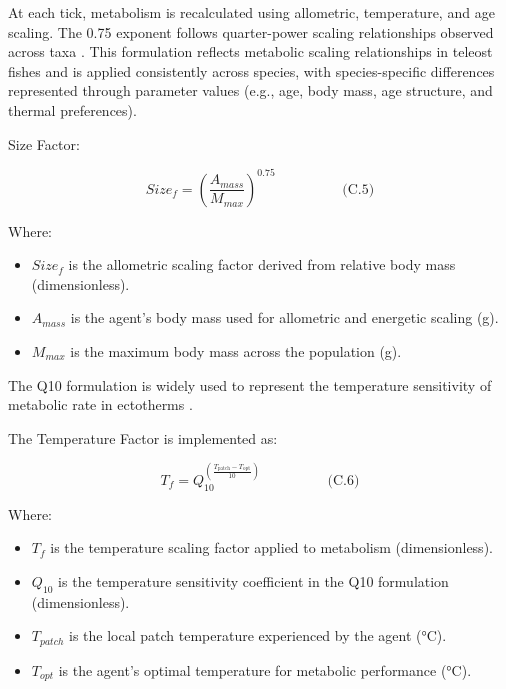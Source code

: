 \documentclass[
]{book}
\begin{document}
At each tick, metabolism is recalculated using allometric, temperature,
and age scaling. The 0.75 exponent follows quarter-power scaling
relationships observed across taxa \citep{kleiber_body_1932, west_general_1997, brown_toward_2004}. This formulation reflects
metabolic scaling relationships in teleost fishes and is applied
consistently across species, with species-specific differences
represented through parameter values (e.g., age, body mass, age
structure, and thermal preferences).

Size Factor:

\[
\begin{equation} Size_{f} = \left(\frac{{A_{mass}}}{M_{max}}\right)^{0.75}  \hspace{2cm} \text{(C.5)} \end{equation}
\]

Where:

\begin{itemize}
\item
  \(Size_{f}\) is the allometric scaling factor derived from relative
  body mass (dimensionless).
\item
  \(A_{mass}\) is the agent's body mass used for allometric and
  energetic scaling (g).
\item
  \(M_{max}\) is the maximum body mass across the population (g).
\end{itemize}

The Q10 formulation is widely used to represent the temperature
sensitivity of metabolic rate in ectotherms
\citep{schmidt_nielsen_animal_1997, brown_toward_2004}.

The Temperature Factor is implemented as:

\[
\begin{equation} T_{f} = Q_{10}^{\left(\frac{T_{\text{patch}} - T_{\text{opt}}}{10}\right)}  \hspace{2cm} \text{(C.6)} \end{equation}
\]

Where:

\begin{itemize}
\item
  \(T_{f}\) is the temperature scaling factor applied to metabolism
  (dimensionless).
\item
  \(Q_{10}\) is the temperature sensitivity coefficient in the Q10
  formulation (dimensionless).
\item
  \(T_{patch}\) is the local patch temperature experienced by the agent
  (°C).
\item
  \(T_{opt}\) is the agent's optimal temperature for metabolic
  performance (°C).
\end{itemize}
\end{document}
